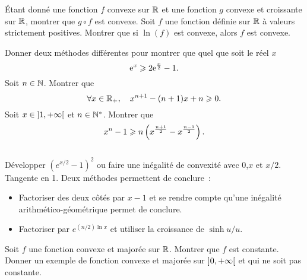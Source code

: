 \documentclass{magnolia}
\begin{document}

\begin{questions}
\question Étant donné une fonction $f$ convexe sur $\mathbb{R}$ et une fonction $g$
  convexe et croissante sur $\mathbb{R}$, montrer que $g\circ f$ est convexe.
\question Soit $f$ une fonction définie sur $\mathbb{R}$ à valeurs strictement
  positives. Montrer que si $\ln(f)$ est convexe, alors $f$ est convexe.
\end{questions}


\begin{questions}
\question Donner deux méthodes différentes pour montrer que quel que soit le
  réel $x$
  \[{\rm e}^x \geqslant 2{\rm e}^{\frac{x}{2}}-1.\]
\question Soit $n\in\mathbb{N}$. Montrer que
  \[\forall x\in\mathbb{R}_+ ,\quad x^{n+1}-(n+1)x+n \geqslant 0.\]
\question Soit $x\in\left]1,+\infty\right[$ et $n\in{\mathbb{N}^*}$. Montrer que
  \[x^n-1 \geqslant n\left(x^{\frac{n+1}{2}}-x^{\frac{n-1}{2}}\right).\]
\end{questions}
\begin{sol}
$\quad$
\begin{questions}
\question Développer $(e^{x/2}-1)^2$ ou faire une inégalité de convexité avec
  0,$x$ et $x/2$.
\question Tangente en 1.
\question Deux méthodes permettent de conclure~:
  \begin{itemize}
  \item Factoriser des deux côtés par $x-1$ et se rendre compte qu'une inégalité
    arithmético-géométrique permet de conclure.
  \item Factoriser par $e^{(n/2)\ln x}$ et utiliser la croissance de $\sinh u/u$.
  \end{itemize}
\end{questions}
\end{sol}




\begin{questions}
\question Soit $f$ une fonction convexe et majorée sur $\mathbb{R}$. Montrer que $f$
  est constante.
\question Donner un exemple de fonction convexe et majorée sur
  $\left]0,+\infty\right[$ et qui ne soit pas constante.
\end{questions}
\end{document}
